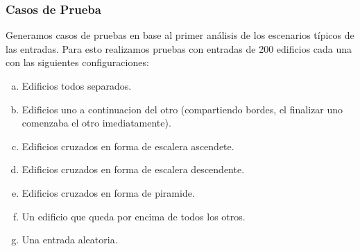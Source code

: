 \subsubsection*{Casos de Prueba}

Generamos casos de pruebas en base al primer análisis de los escenarios típicos de las entradas. Para esto realizamos pruebas con entradas de 200 edificios cada una con las siguientes configuraciones:

\begin{enumerate}[(a)]
	\item Edificios todos separados.
	\item Edificios uno a continuacion del otro (compartiendo bordes, el finalizar uno comenzaba el otro imediatamente).
	\item Edificios cruzados en forma de escalera ascendete.
	\item Edificios cruzados en forma de escalera descendente.
	\item Edificios cruzados en forma de piramide.
	\item Un edificio que queda por encima de todos los otros.
	\item Una entrada aleatoria.
\end{enumerate}


